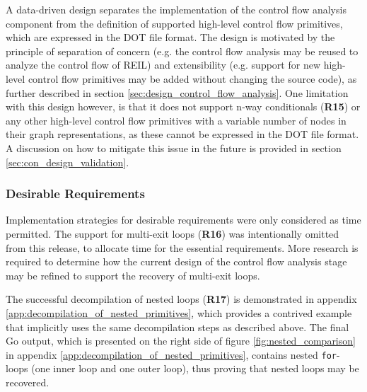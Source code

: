 A data-driven design separates the implementation of the control flow analysis component from the definition of supported high-level control flow primitives, which are expressed in the DOT file format. The design is motivated by the principle of separation of concern (e.g. the control flow analysis may be reused to analyze the control flow of REIL) and extensibility (e.g. support for new high-level control flow primitives may be added without changing the source code), as further described in section \ref{sec:design_control_flow_analysis}. One limitation with this design however, is that it does not support n-way conditionals (\textbf{R15}) or any other high-level control flow primitives with a variable number of nodes in their graph representations, as these cannot be expressed in the DOT file format. A discussion on how to mitigate this issue in the future is provided in section \ref{sec:con_design_validation}.


\subsubsection{Desirable Requirements}
\label{sec:eval_control_flow_analysis_library_desirable_requirements}


Implementation strategies for desirable requirements were only considered as time permitted. The support for multi-exit loops (\textbf{R16}) was intentionally omitted from this release, to allocate time for the essential requirements. More research is required to determine how the current design of the control flow analysis stage may be refined to support the recovery of multi-exit loops.


The successful decompilation of nested loops (\textbf{R17}) is demonstrated in appendix \ref{app:decompilation_of_nested_primitives}, which provides a contrived example that implicitly uses the same decompilation steps as described above. The final Go output, which is presented on the right side of figure \ref{fig:nested_comparison} in appendix \ref{app:decompilation_of_nested_primitives}, contains nested \texttt{for}-loops (one inner loop and one outer loop), thus proving that nested loops may be recovered.
